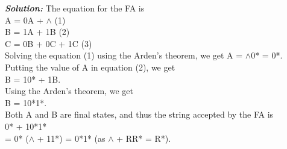 \documentclass [7pt]{beamer}
\begin{document}
\begin{frame}
\justifying
\textit{\textbf{Solution:}} The equation for the FA is\\
\hspace*{5cm} A = 0A + $\land$ \hspace*{4.5cm}(1)\\
\hspace*{5cm} B = 1A + 1B \hspace*{4.3cm}(2)\\
\hspace*{5cm} C = 0B + 0C + 1C \hspace*{3.5cm}(3)\\
Solving the equation (1) using the Arden’s theorem, we get A = $\land$0* = 0*.\\
 Putting the value of A in equation (2), we get\\
\hspace*{5cm} B = 10* + 1B.\\
 Using the Arden’s theorem, we get\\
\hspace*{5cm} B = 10*1*.\\
 Both A and B are final states, and thus the string accepted by the FA is\\
\hspace*{5cm} 0* + 10*1*\\
\hspace*{5cm}= 0* ($\land$ + 11*) = 0*1* (as $\land$ + RR* = R*).
\end{frame}
\end{document}
